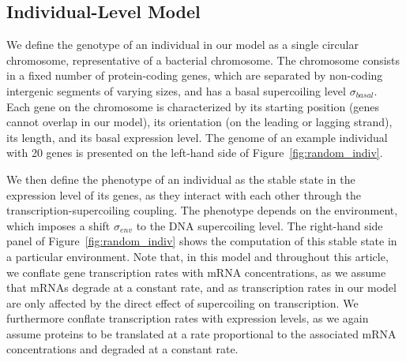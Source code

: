 \subsection{Individual-Level Model}
\label{sec:indiv_model}

We define the genotype of an individual in our model as a single circular chromosome, representative of a bacterial chromosome.
The chromosome consists in a fixed number of protein-coding genes, which are separated by non-coding intergenic segments of varying sizes, and has a basal supercoiling level $\sigma_{basal}$.
Each gene on the chromosome is characterized by its starting position (genes cannot overlap in our model), its orientation (on the leading or lagging strand), its length, and its basal expression level.
The genome of an example individual with 20 genes is presented on the left-hand side of Figure~\ref{fig:random_indiv}.

We then define the phenotype of an individual as the stable state in the expression level of its genes, as they interact with each other through the transcription-supercoiling coupling.
The phenotype depends on the environment, which imposes a shift $\sigma_{env}$ to the DNA supercoiling level.
The right-hand side panel of Figure~\ref{fig:random_indiv} shows the computation of this stable state in a particular environment.
Note that, in this model and throughout this article, we conflate
gene transcription rates with mRNA concentrations, as we assume that mRNAs degrade at a constant rate, and as transcription rates in our model are only affected by the direct effect of supercoiling on transcription.
We furthermore conflate transcription rates with expression levels, as we again assume proteins to be translated at a rate proportional to the associated mRNA concentrations and degraded at a constant rate.

